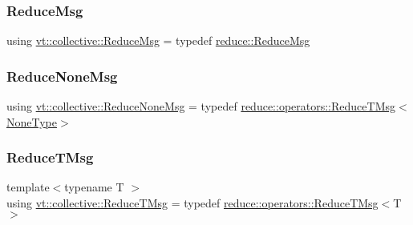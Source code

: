 \subsubsection{\texorpdfstring{Reduce\+Msg}{ReduceMsg}}
{\footnotesize\ttfamily using \hyperlink{namespacevt_1_1collective_a4c5bf7769ad4396573d6bcc85ec430a4}{vt\+::collective\+::\+Reduce\+Msg} = typedef \hyperlink{structvt_1_1collective_1_1reduce_1_1_reduce_msg}{reduce\+::\+Reduce\+Msg}}

\mbox{\label{namespacevt_1_1collective_aa439a90f05078f2bcf918641c951946f}} 
\subsubsection{\texorpdfstring{Reduce\+None\+Msg}{ReduceNoneMsg}}
{\footnotesize\ttfamily using \hyperlink{namespacevt_1_1collective_aa439a90f05078f2bcf918641c951946f}{vt\+::collective\+::\+Reduce\+None\+Msg} = typedef \hyperlink{namespacevt_1_1collective_1_1reduce_1_1operators_a85097552afc7e87d5d5092f068223ca0}{reduce\+::operators\+::\+Reduce\+T\+Msg}$<$\hyperlink{namespacevt_1_1collective_af988b64711231f96d33ebfaf891e52a4}{None\+Type}$>$}

\mbox{\label{namespacevt_1_1collective_a28b82d5d48c9bc6e4fd738fcbf9e0f62}} 
\subsubsection{\texorpdfstring{Reduce\+T\+Msg}{ReduceTMsg}}
{\footnotesize\ttfamily template$<$typename T $>$ \\
using \hyperlink{namespacevt_1_1collective_a28b82d5d48c9bc6e4fd738fcbf9e0f62}{vt\+::collective\+::\+Reduce\+T\+Msg} = typedef \hyperlink{namespacevt_1_1collective_1_1reduce_1_1operators_a85097552afc7e87d5d5092f068223ca0}{reduce\+::operators\+::\+Reduce\+T\+Msg}$<$T$>$}

\mbox{\label{namespacevt_1_1collective_a711b5dd8547fee4b63077f44188959f4}} 
